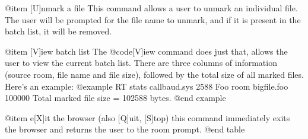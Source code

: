 @item [U]nmark a file
This command allows a user to unmark an individual file.  The user will
be prompted for the file name to unmark, and if it is present in the batch
list, it will be removed.

@item [V]iew batch list
The @code{[V]iew} command does just that, allows the user to view
the current batch list.  There are three columns of information
(source room, file name and file size), followed by the total size of
all marked files.  Here's an example:
@example
RT stats                callbaud.sys    2588
Foo room                bigfile.foo     100000
Total marked file size = 102588 bytes.
@end example

@item e[X]it the browser (also [Q]uit, [S]top)
this command immediately exits the browser and returns the
user to the room prompt.
@end table

